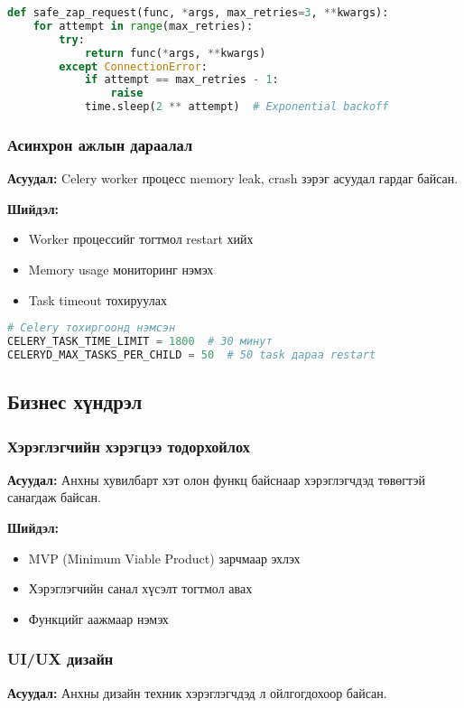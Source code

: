 \documentclass[main.tex]{subfiles}
\begin{document}
\begin{lstlisting}[language=Python, caption=ZAP алдааны засварлалт]
def safe_zap_request(func, *args, max_retries=3, **kwargs):
    for attempt in range(max_retries):
        try:
            return func(*args, **kwargs)
        except ConnectionError:
            if attempt == max_retries - 1:
                raise
            time.sleep(2 ** attempt)  # Exponential backoff
\end{lstlisting}

\subsubsection{Асинхрон ажлын дараалал}
\textbf{Асуудал:} Celery worker процесс memory leak, crash зэрэг асуудал гардаг байсан.

\textbf{Шийдэл:}
\begin{itemize}
    \item Worker процессийг тогтмол restart хийх
    \item Memory usage мониторинг нэмэх
    \item Task timeout тохируулах
\end{itemize}

\begin{lstlisting}[language=Python, caption=Celery тохиргоонд нэмсэн]
# Celery тохиргоонд нэмсэн
CELERY_TASK_TIME_LIMIT = 1800  # 30 минут
CELERYD_MAX_TASKS_PER_CHILD = 50  # 50 task дараа restart
\end{lstlisting}

\subsection{Бизнес хүндрэл}

\subsubsection{Хэрэглэгчийн хэрэгцээ тодорхойлох}
\textbf{Асуудал:} Анхны хувилбарт хэт олон функц байснаар хэрэглэгчдэд төвөгтэй санагдаж байсан.

\textbf{Шийдэл:}
\begin{itemize}
    \item MVP (Minimum Viable Product) зарчмаар эхлэх
    \item Хэрэглэгчийн санал хүсэлт тогтмол авах
    \item Функцийг аажмаар нэмэх
\end{itemize}

\subsubsection{UI/UX дизайн}
\textbf{Асуудал:} Анхны дизайн техник хэрэглэгчдэд л ойлгогдохоор байсан.
\end{document}
